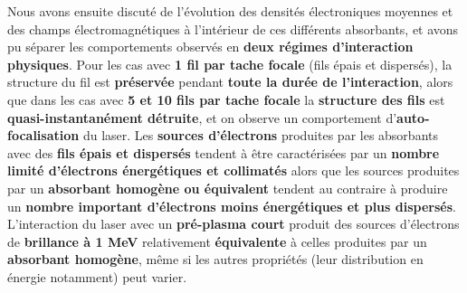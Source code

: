 \begin{refsection}
Nous avons ensuite discuté de l'évolution des densités électroniques moyennes et des champs électromagnétiques à l'intérieur de ces différents absorbants, et avons pu séparer les comportements observés en \textbf{deux régimes d'interaction physiques}. Pour les cas avec \textbf{1 fil par tache focale} (fils épais et dispersés), la structure du fil est \textbf{préservée} pendant \textbf{toute la durée de l'interaction}, alors que dans les cas avec \textbf{5 et 10 fils par tache focale} la \textbf{structure des fils} est \textbf{quasi-instantanément détruite}, et on observe un comportement d'\textbf{auto-focalisation} du laser. 
Les \textbf{sources d'électrons} produites par les absorbants avec des \textbf{fils épais et dispersés} tendent à être caractérisées par un \textbf{nombre limité d'électrons énergétiques et collimatés} alors que les sources produites par un \textbf{absorbant homogène ou équivalent} tendent au contraire à produire un \textbf{nombre important d'électrons moins énergétiques et plus dispersés}. L'interaction du laser avec un \textbf{pré-plasma court} produit des sources d'électrons de \textbf{brillance à 1 MeV} relativement \textbf{équivalente} à celles produites par un \textbf{absorbant homogène}, même si les autres propriétés (leur distribution en énergie notamment) peut varier.


\end{refsection}
